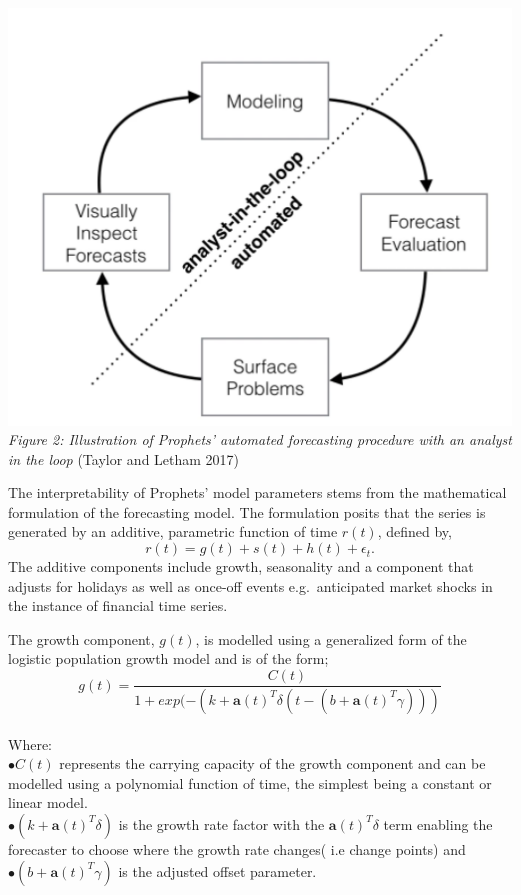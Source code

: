\documentclass[12pt,a4paper]{article}
\numberwithin{equation}{section}
\numberwithin{figure}{section}
\numberwithin{table}{section}
\begin{document}
\includegraphics[width=1.00000\textwidth]{analyst in the loop.png}\\
\emph{Figure 2: Illustration of Prophets' automated forecasting
procedure with an analyst in the loop} (Taylor and Letham 2017)

The interpretability of Prophets' model parameters stems from the
mathematical formulation of the forecasting model. The formulation
posits that the series is generated by an additive, parametric function
of time \(r(t)\), defined by,
\[ r(t) = g(t) + s(t) +  h(t) + \epsilon_t.\] The additive components
include growth, seasonality and a component that adjusts for holidays as
well as once-off events e.g.~anticipated market shocks in the instance
of financial time series.

The growth component, \(g(t)\), is modelled using a generalized form of
the logistic population growth model and is of the form;\\
\[g(t) = \frac{C(t)}{1+exp(-(k+\boldsymbol{a}(t)^T \delta(t-(b+\boldsymbol{a}(t)^T \gamma)))}\]\\
Where:\\
\(\bullet C(t)\) represents the carrying capacity of the growth
component and can be modelled using a polynomial function of time, the
simplest being a constant or linear model.\\
\(\bullet (k+\boldsymbol{a}(t)^T\delta)\) is the growth rate factor with
the \(\boldsymbol{a}(t)^T\delta\) term enabling the forecaster to choose
where the growth rate changes( i.e change points) and\\
\(\bullet (b+\boldsymbol{a}(t)^T \gamma)\) is the adjusted offset
parameter.
\end{document}

